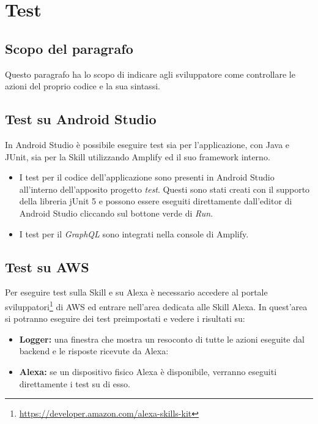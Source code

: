 \clearpage

\section{Test}
\label{sec:test}
\subsection{Scopo del paragrafo}
Questo paragrafo ha lo scopo di indicare agli sviluppatore come controllare le azioni del proprio codice e la sua sintassi.

\subsection{Test su Android Studio}
In Android Studio è possibile eseguire test sia per l'applicazione, con Java e JUnit, sia per la Skill utilizzando Amplify ed il suo framework interno.
\begin{itemize}
    \item I test per il codice dell'applicazione sono presenti in Android Studio all'interno dell'apposito progetto \emph{test}. Questi sono stati creati con il supporto della libreria jUnit 5 e possono essere eseguiti direttamente dall'editor di Android Studio cliccando sul bottone verde di \emph{Run}.
    \item I test per il \emph{GraphQL} sono integrati nella console di Amplify.
\end{itemize}

\subsection{Test su AWS}
Per eseguire test sulla Skill e su Alexa è necessario accedere al portale sviluppatori\footnote{\href{https://developer.amazon.com/alexa-skills-kit}{https://developer.amazon.com/alexa-skills-kit}} di AWS ed entrare nell'area dedicata alle Skill Alexa. In quest'area si potranno eseguire dei test preimpostati e vedere i risultati su:
\begin{itemize}
    \item \textbf{Logger:} una finestra che mostra un resoconto di tutte le azioni eseguite dal backend e le risposte ricevute da Alexa:
    \item \textbf{Alexa:} se un dispositivo fisico Alexa è disponibile, verranno eseguiti direttamente i test su di esso.
\end{itemize}